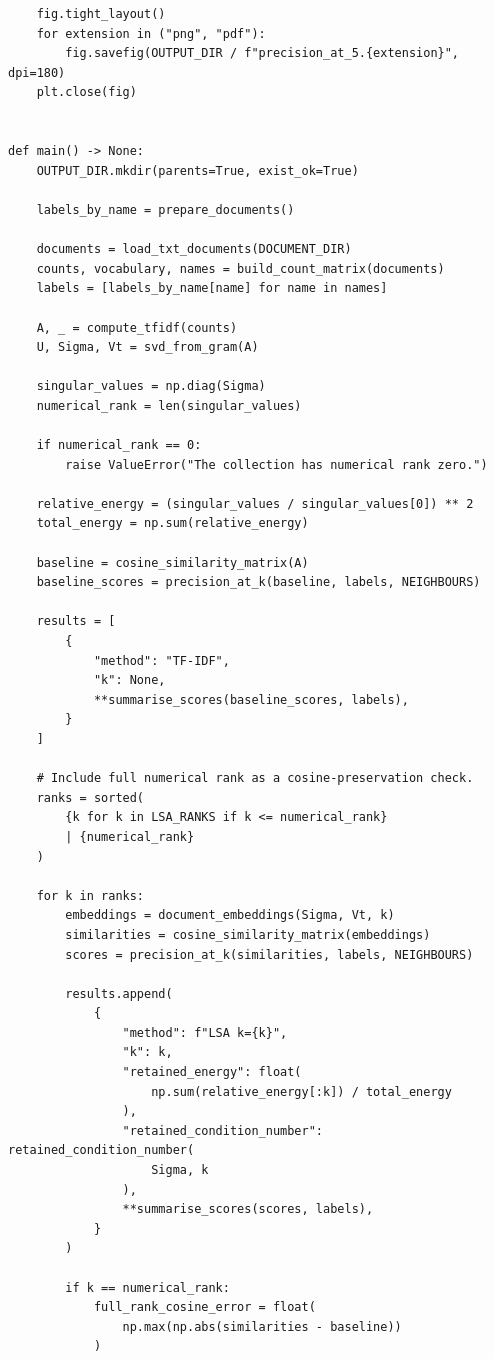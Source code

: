 \documentclass[12pt,a4paper]{report}
\theoremstyle{plain}
\theoremstyle{definition}
\theoremstyle{remark}
\theoremstyle{definition}
\begin{document}
\begin{lstlisting}
    fig.tight_layout()
    for extension in ("png", "pdf"):
        fig.savefig(OUTPUT_DIR / f"precision_at_5.{extension}", dpi=180)
    plt.close(fig)


def main() -> None:
    OUTPUT_DIR.mkdir(parents=True, exist_ok=True)

    labels_by_name = prepare_documents()

    documents = load_txt_documents(DOCUMENT_DIR)
    counts, vocabulary, names = build_count_matrix(documents)
    labels = [labels_by_name[name] for name in names]

    A, _ = compute_tfidf(counts)
    U, Sigma, Vt = svd_from_gram(A)

    singular_values = np.diag(Sigma)
    numerical_rank = len(singular_values)

    if numerical_rank == 0:
        raise ValueError("The collection has numerical rank zero.")

    relative_energy = (singular_values / singular_values[0]) ** 2
    total_energy = np.sum(relative_energy)

    baseline = cosine_similarity_matrix(A)
    baseline_scores = precision_at_k(baseline, labels, NEIGHBOURS)

    results = [
        {
            "method": "TF-IDF",
            "k": None,
            **summarise_scores(baseline_scores, labels),
        }
    ]

    # Include full numerical rank as a cosine-preservation check.
    ranks = sorted(
        {k for k in LSA_RANKS if k <= numerical_rank}
        | {numerical_rank}
    )

    for k in ranks:
        embeddings = document_embeddings(Sigma, Vt, k)
        similarities = cosine_similarity_matrix(embeddings)
        scores = precision_at_k(similarities, labels, NEIGHBOURS)

        results.append(
            {
                "method": f"LSA k={k}",
                "k": k,
                "retained_energy": float(
                    np.sum(relative_energy[:k]) / total_energy
                ),
                "retained_condition_number": retained_condition_number(
                    Sigma, k
                ),
                **summarise_scores(scores, labels),
            }
        )

        if k == numerical_rank:
            full_rank_cosine_error = float(
                np.max(np.abs(similarities - baseline))
            )


\end{lstlisting}
\end{document}
